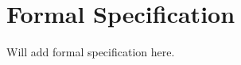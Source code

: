 \appendix
\renewcommand{\thechapter}{A}
\renewcommand{\chaptername}{Appendix}

\chapter{Formal Specification}

Will add formal specification here.
